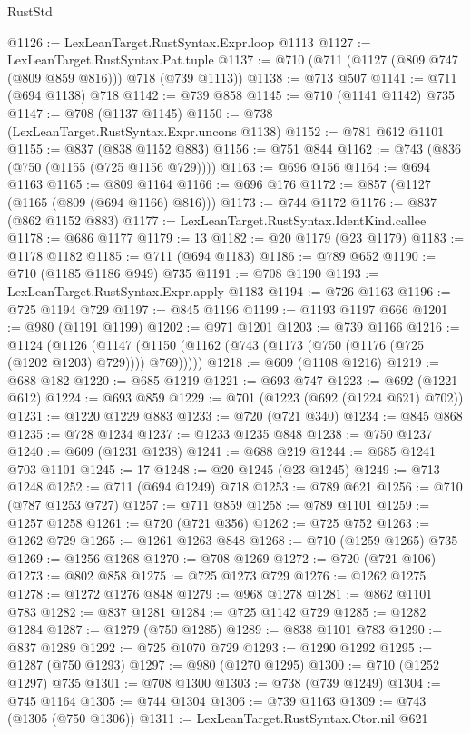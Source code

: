 \begin{lexlean}{RustStd}
\begin{coremodule}
@1126 := LexLeanTarget.RustSyntax.Expr.loop @1113
@1127 := LexLeanTarget.RustSyntax.Pat.tuple
@1137 := @710 (@711 (@1127 (@809 @747 (@809 @859 @816))) @718 (@739 @1113))
@1138 := @713 @507
@1141 := @711 (@694 @1138) @718
@1142 := @739 @858
@1145 := @710 (@1141 @1142) @735
@1147 := @708 (@1137 @1145)
@1150 := @738 (LexLeanTarget.RustSyntax.Expr.uncons @1138)
@1152 := @781 @612 @1101
@1155 := @837 (@838 @1152 @883)
@1156 := @751 @844
@1162 := @743 (@836 (@750 (@1155 (@725 @1156 @729))))
@1163 := @696 @156
@1164 := @694 @1163
@1165 := @809 @1164
@1166 := @696 @176
@1172 := @857 (@1127 (@1165 (@809 (@694 @1166) @816)))
@1173 := @744 @1172
@1176 := @837 (@862 @1152 @883)
@1177 := LexLeanTarget.RustSyntax.IdentKind.callee
@1178 := @686 @1177
@1179 := 13
@1182 := @20 @1179 (@23 @1179)
@1183 := @1178 @1182
@1185 := @711 (@694 @1183)
@1186 := @789 @652
@1190 := @710 (@1185 @1186 @949) @735
@1191 := @708 @1190
@1193 := LexLeanTarget.RustSyntax.Expr.apply @1183
@1194 := @726 @1163
@1196 := @725 @1194 @729
@1197 := @845 @1196
@1199 := @1193 @1197 @666
@1201 := @980 (@1191 @1199)
@1202 := @971 @1201
@1203 := @739 @1166
@1216 := @1124
    (@1126 (@1147 (@1150 (@1162 (@743 (@1173 (@750 (@1176 (@725 (@1202 @1203) @729)))) @769)))))
@1218 := @609 (@1108 @1216)
@1219 := @688 @182
@1220 := @685 @1219
@1221 := @693 @747
@1223 := @692 (@1221 @612)
@1224 := @693 @859
@1229 := @701 (@1223 (@692 (@1224 @621) @702))
@1231 := @1220 @1229 @883
@1233 := @720 (@721 @340)
@1234 := @845 @868
@1235 := @728 @1234
@1237 := @1233 @1235 @848
@1238 := @750 @1237
@1240 := @609 (@1231 @1238)
@1241 := @688 @219
@1244 := @685 @1241 @703 @1101
@1245 := 17
@1248 := @20 @1245 (@23 @1245)
@1249 := @713 @1248
@1252 := @711 (@694 @1249) @718
@1253 := @789 @621
@1256 := @710 (@787 @1253 @727)
@1257 := @711 @859
@1258 := @789 @1101
@1259 := @1257 @1258
@1261 := @720 (@721 @356)
@1262 := @725 @752
@1263 := @1262 @729
@1265 := @1261 @1263 @848
@1268 := @710 (@1259 @1265) @735
@1269 := @1256 @1268
@1270 := @708 @1269
@1272 := @720 (@721 @106)
@1273 := @802 @858
@1275 := @725 @1273 @729
@1276 := @1262 @1275
@1278 := @1272 @1276 @848
@1279 := @968 @1278
@1281 := @862 @1101 @783
@1282 := @837 @1281
@1284 := @725 @1142 @729
@1285 := @1282 @1284
@1287 := @1279 (@750 @1285)
@1289 := @838 @1101 @783
@1290 := @837 @1289
@1292 := @725 @1070 @729
@1293 := @1290 @1292
@1295 := @1287 (@750 @1293)
@1297 := @980 (@1270 @1295)
@1300 := @710 (@1252 @1297) @735
@1301 := @708 @1300
@1303 := @738 (@739 @1249)
@1304 := @745 @1164
@1305 := @744 @1304
@1306 := @739 @1163
@1309 := @743 (@1305 (@750 @1306))
@1311 := LexLeanTarget.RustSyntax.Ctor.nil @621

\end{coremodule}
\end{lexlean}
